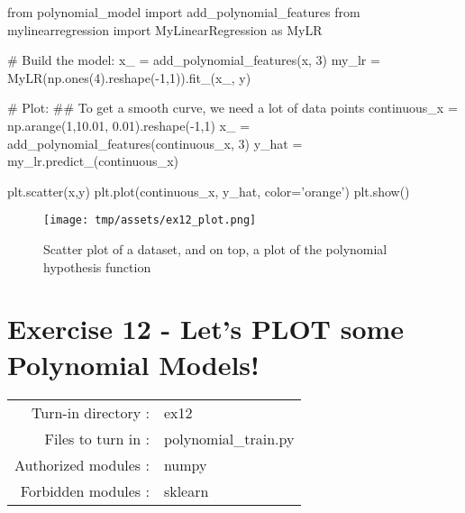 \documentclass[]{article}
\newenvironment{Shaded}{\begin{snugshade}}{\end{snugshade}}
\newcommand{\CommentTok}[1]{\textcolor[rgb]{0.48,0.49,0.49}{#1}}
\newcommand{\DecValTok}[1]{\textcolor[rgb]{0.96,0.45,0.00}{#1}}
\newcommand{\FloatTok}[1]{\textcolor[rgb]{0.96,0.45,0.00}{#1}}
\newcommand{\ImportTok}[1]{\textcolor[rgb]{0.15,0.68,0.38}{#1}}
\newcommand{\NormalTok}[1]{\textcolor[rgb]{0.81,0.81,0.76}{#1}}
\newcommand{\OperatorTok}[1]{\textcolor[rgb]{0.81,0.81,0.76}{#1}}
\newcommand{\StringTok}[1]{\textcolor[rgb]{0.96,0.31,0.31}{#1}}
\begin{document}
\begin{Shaded}
\begin{Highlighting}[]
\ImportTok{from}\NormalTok{ polynomial_model }\ImportTok{import}\NormalTok{ add_polynomial_features}
\ImportTok{from}\NormalTok{ mylinearregression }\ImportTok{import}\NormalTok{ MyLinearRegression }\ImportTok{as}\NormalTok{ MyLR}

\CommentTok{# Build the model:}
\NormalTok{x_ }\OperatorTok{=}\NormalTok{ add_polynomial_features(x, }\DecValTok{3}\NormalTok{)}
\NormalTok{my_lr }\OperatorTok{=}\NormalTok{ MyLR(np.ones(}\DecValTok{4}\NormalTok{).reshape(}\OperatorTok{-}\DecValTok{1}\NormalTok{,}\DecValTok{1}\NormalTok{)).fit_(x_, y)}

\CommentTok{# Plot:}
\CommentTok{## To get a smooth curve, we need a lot of data points}
\NormalTok{continuous_x }\OperatorTok{=}\NormalTok{ np.arange(}\DecValTok{1}\NormalTok{,}\FloatTok{10.01}\NormalTok{, }\FloatTok{0.01}\NormalTok{).reshape(}\OperatorTok{-}\DecValTok{1}\NormalTok{,}\DecValTok{1}\NormalTok{)}
\NormalTok{x_ }\OperatorTok{=}\NormalTok{ add_polynomial_features(continuous_x, }\DecValTok{3}\NormalTok{)}
\NormalTok{y_hat }\OperatorTok{=}\NormalTok{ my_lr.predict_(continuous_x)}

\NormalTok{plt.scatter(x,y)}
\NormalTok{plt.plot(continuous_x, y_hat, color}\OperatorTok{=}\StringTok{'orange'}\NormalTok{)}
\NormalTok{plt.show()}
\end{Highlighting}
\end{Shaded}

\begin{figure}
\centering
\texttt{[image: tmp/assets/ex12\_plot.png]}
\caption{Scatter plot of a dataset, and on top, a plot of the polynomial
hypothesis function}
\end{figure}

\clearpage

\hypertarget{exercise-12---lets-plot-some-polynomial-models-1}{%
\section{Exercise 12 - Let's PLOT some Polynomial
Models!}\label{exercise-12---lets-plot-some-polynomial-models-1}}

\begin{longtable}[]{@{}rl@{}}
\toprule
\endhead
Turn-in directory : & ex12\tabularnewline
Files to turn in : & polynomial\_train.py\tabularnewline
Authorized modules : & numpy\tabularnewline
Forbidden modules : & sklearn\tabularnewline
\bottomrule
\end{longtable}
\end{document}
